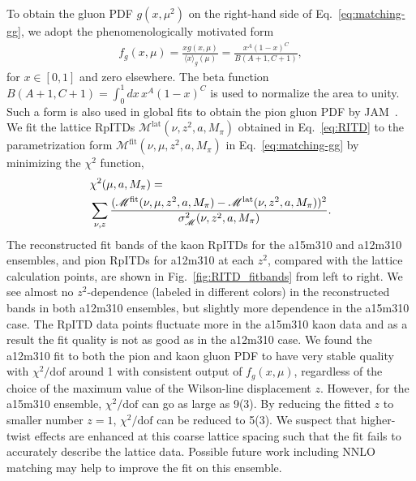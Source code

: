 To obtain the gluon PDF $g(x,\mu^2)$ on the right-hand side of Eq.~\ref{eq:matching-gg}, we adopt the phenomenologically motivated form
%
\begin{align}
f_g(x,\mu) = \frac{xg(x, \mu)}{\langle x \rangle_g(\mu)} = \frac{x^A(1-x)^C}{B(A+1,C+1)},
\label{functional}
\end{align}
%
for $x\in[0,1]$ and zero elsewhere.
The beta function $B(A+1,C+1)=\int_0^1 dx\, x^A(1-x)^C$ is used to normalize the area to unity.
Such a form is also used in global fits to obtain the pion gluon PDF by JAM~\cite{Barry:2018ort,Cao:2021aci}.
%
We fit the lattice RpITDs $\mathscr{M}^\text{lat} (\nu,z^2,a,M_\pi)$ obtained in Eq.~\ref{eq:RITD} to the parametrization form $\mathscr{M}^\text{fit}(\nu,\mu,z^2,a,M_\pi)$ in Eq.~\ref{eq:matching-gg} by minimizing the $\chi^2$ function,
\begin{equation}
\label{eq:chi2-RITD-fit}
    \begin{split}
    & \chi^2(\mu,a,M_\pi)=\\
    & \sum _{\nu,z} \frac{(\mathscr{M}^{\rm fit}(\nu,\mu,z^2,a,M_\pi)-\mathscr{M}^{\rm lat}(\nu,z^2,a,M_\pi))^2}{\sigma^2_{\mathscr{M}}(\nu,z^2,a,M_\pi)}.
    \end{split}
\end{equation}
The reconstructed fit bands of the kaon RpITDs for the a15m310 and a12m310 ensembles, and pion RpITDs for a12m310 at each $z^2$, compared with the lattice calculation points, are shown in Fig.~\ref{fig:RITD_fitbands} from left to right.
We see almost no $z^2$-dependence (labeled in different colors) in the reconstructed bands in both a12m310 ensembles, but slightly more dependence in the a15m310 case.
The RpITD data points fluctuate more in the a15m310 kaon data and as a result the fit quality is not as good as in the a12m310 case.
We found the a12m310 fit to both the pion and kaon gluon PDF to have very stable quality with $\chi^2/\text{dof}$ around 1 with consistent output of $f_g(x,\mu)$, regardless of the choice of the maximum value of the Wilson-line displacement $z$.
However, for the a15m310 ensemble, $\chi^2/\text{dof}$ can go as large as 9(3).
By reducing the fitted $z$ to smaller number $z=1$, $\chi^2/\text{dof}$ can be reduced to 5(3).
We suspect that higher-twist effects are enhanced at this coarse lattice spacing such that the fit fails to accurately describe the lattice data.
Possible future work including NNLO matching may help to improve the fit on this ensemble.



